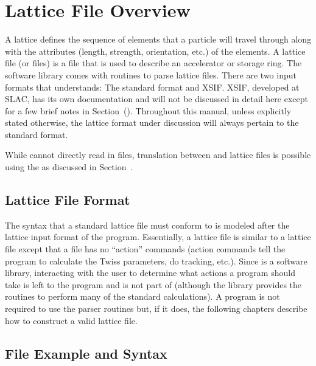 \chapter{Lattice File Overview}

A lattice defines
the sequence of elements that a particle will travel
through along with the attributes (length,
strength, orientation, etc.) of the elements. 
A lattice file (or files) is a file that is used to describe an 
accelerator or storage ring. 
The \bmad software library comes with
routines to parse lattice files. There are two input formats
that \bmad understands: The \bmad standard format and
XSIF\cite{b:xsif}. XSIF, developed at SLAC,
has its own documentation and will not be discussed in detail
here except for a few brief notes in Section~(). 
Throughout this manual, unless explicitly stated otherwise,
the lattice format under discussion will always pertain to the \bmad
standard format. 

While \bmad cannot directly read in \mad\cite{b:maduser} files, 
translation between \mad and \bmad lattice files is possible using
the  as discussed in Section~.

\section{Lattice File Format}
\label{s:lattice.file.formats}

The syntax that a \bmad standard lattice file must conform to is
modeled after the lattice input format of the \mad program.
Essentially, a \bmad lattice file is similar to a \mad lattice file
except that a \bmad file has no ``action'' commands (action commands
tell the program to calculate the Twiss parameters, do tracking,
etc.).  Since \bmad is a software library, interacting with the user to 
determine what actions a program
should take is left to the program and is not part of \bmad (although
the \bmad library provides the routines to perform many of the standard
calculations). A program is not required to use the \bmad parser
routines but, if it does, the following chapters describe how to
construct a valid lattice file.

\section{File Example and Syntax}

